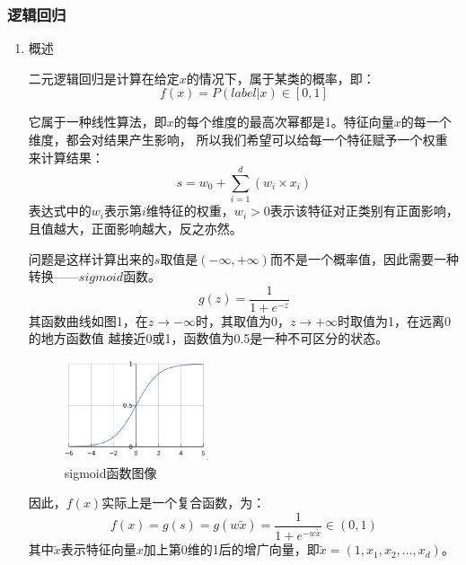 \documentclass[UTF8,a4paper,12pt]{article}
\begin{document}
\subsubsection{逻辑回归}
\begin{enumerate}[itemindent=0.5em,label=\arabic*、]
  \item 概述
  \par \qquad 二元逻辑回归是计算在给定$x$的情况下，属于某类的概率，即：
  \begin{equation}
    f(x) = P(label|x) \in [0, 1]
  \end{equation}
  \par \qquad 它属于一种线性算法，即$x$的每个维度的最高次幂都是1。特征向量$x$的每一个维度，都会对结果产生影响，
  所以我们希望可以给每一个特征赋予一个权重来计算结果：
  \begin{equation}
    s = w_0 + \sum_{i=1}^d (w_i \times x_i)
  \end{equation}
  表达式中的$w_i$表示第$i$维特征的权重，$w_i>0$表示该特征对正类别有正面影响，且值越大，正面影响越大，反之亦然。
  \par \qquad 问题是这样计算出来的$s$取值是$(-\infty, +\infty)$而不是一个概率值，因此需要一种转换——$sigmoid$函数。
  \begin{equation}
    g(z) = \frac{1}{1 + e^{-z}}
  \end{equation}
  其函数曲线如图1，在$z \rightarrow -\infty$时，其取值为0，$z \rightarrow +\infty$时取值为1，在远离0的地方函数值
  越接近0或1，函数值为0.5是一种不可区分的状态。
  \begin{figure}[h]
  \begin{center}
  \includegraphics[width=0.4\textwidth]{sigmoid.png} %
  \caption{sigmoid函数图像}
  \end{center}
  \end{figure}
  \par \qquad 因此，$f(x)$实际上是一个复合函数，为：
  \begin{equation}
    f(x) = g(s) = g(w\widetilde{x}) = \frac{1}{1 + e^{-w\widetilde{x}}} \in (0, 1)
  \end{equation}
  其中$\widetilde{x}$表示特征向量$x$加上第0维的1后的增广向量，即$\widetilde{x} = (1, x_1, x_2, ..., x_d)$。

\end{enumerate}
\end{document}

